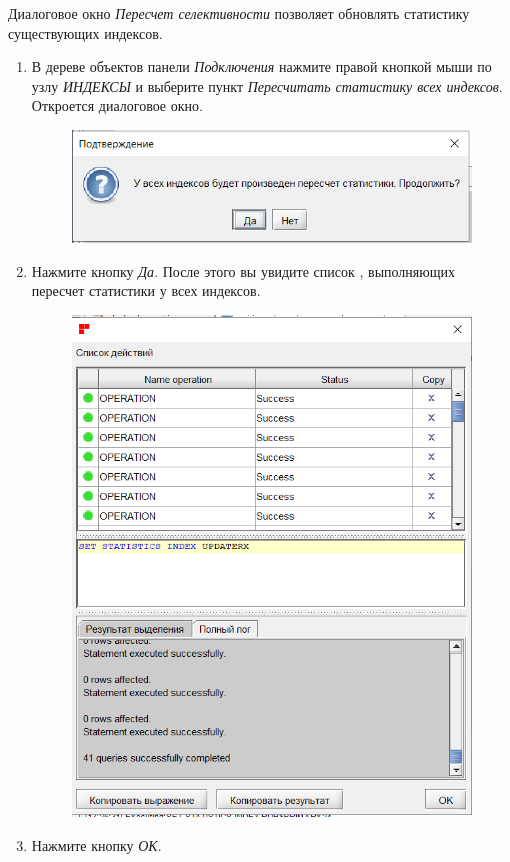 \label{sec:crind}

Диалоговое окно \textit{Пересчет селективности} позволяет обновлять статистику существующих индексов.

\begin{enumerate}[leftmargin=26pt]
	\item В дереве объектов панели \textit{Подключения} нажмите правой кнопкой мыши по узлу \textit{ИНДЕКСЫ} и выберите пункт \textit{Пересчитать статистику всех индексов}. Откроется диалоговое окно.
	\begin{figure}[H]
		\centering
		\includegraphics[width = 0.75\linewidth]{img/selectivity.png}
	\end{figure}	
	\item Нажмите кнопку \textit{Да}. После этого вы увидите список , выполняющих пересчет статистики у всех индексов.  
	\begin{figure}[H]
		\centering
		\includegraphics[width = 0.75\linewidth]{img/selectivity2.png}
	\end{figure}	
	\item Нажмите кнопку \textit{ОК}.
\end{enumerate}

